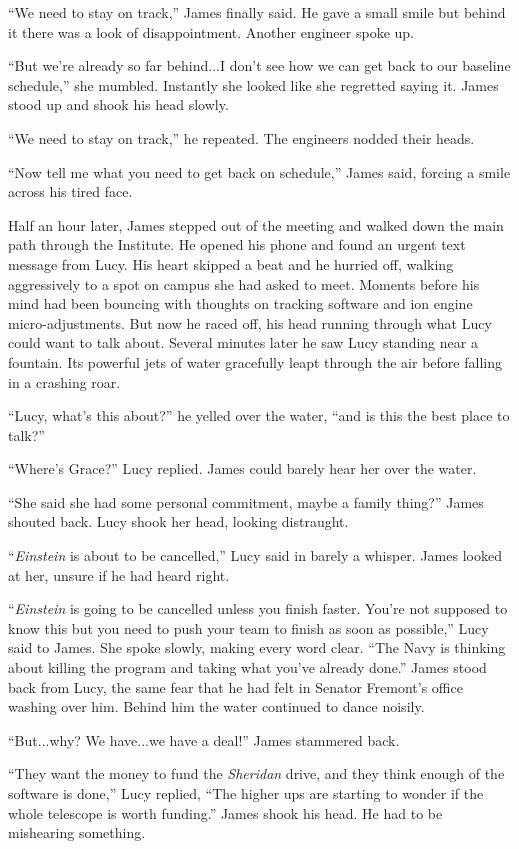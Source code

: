 \documentclass[openany, 12pt]{book} %
\begin{document}
``We need to stay on track,'' James finally said. He gave a small smile but behind it there was a look of disappointment. Another engineer spoke up.

``But we're already so far behind...I don't see how we can get back to our baseline schedule,'' she mumbled. Instantly she looked like she regretted saying it. James stood up and shook his head slowly.

``We need to stay on track,'' he repeated. The engineers nodded their heads. 

``Now tell me what you need to get back on schedule,'' James said, forcing a smile across his tired face.

Half an hour later, James stepped out of the meeting and walked down the main path through the Institute. He opened his phone and found an urgent text message from Lucy. His heart skipped a beat and he hurried off, walking aggressively to a spot on campus she had asked to meet. Moments before his mind had been bouncing with thoughts on tracking software and ion engine micro-adjustments. But now he raced off, his head running through what Lucy could want to talk about. Several minutes later he saw Lucy standing near a fountain. Its powerful jets of water gracefully leapt through the air before falling in a crashing roar.

``Lucy, what's this about?'' he yelled over the water, ``and is this the best place to talk?''

``Where's Grace?'' Lucy replied. James could barely hear her over the water.

``She said she had some personal commitment, maybe a family thing?'' James shouted back. Lucy shook her head, looking distraught.

``\textit{Einstein} is about to be cancelled,'' Lucy said in barely a whisper. James looked at her, unsure if he had heard right.

``\textit{Einstein} is going to be cancelled unless you finish faster. You're not supposed to know this but you need to push your team to finish as soon as possible,'' Lucy said to James. She spoke slowly, making every word clear. ``The Navy is thinking about killing the program and taking what you've already done.'' James stood back from Lucy, the same fear that he had felt in Senator Fremont's office washing over him. Behind him the water continued to dance noisily.

``But...why? We have...we have a deal!'' James stammered back.

``They want the money to fund the \textit{Sheridan} drive, and they think enough of the software is done,'' Lucy replied, ``The higher ups are starting to wonder if the whole telescope is worth funding.'' James shook his head. He had to be mishearing something.
\end{document}
